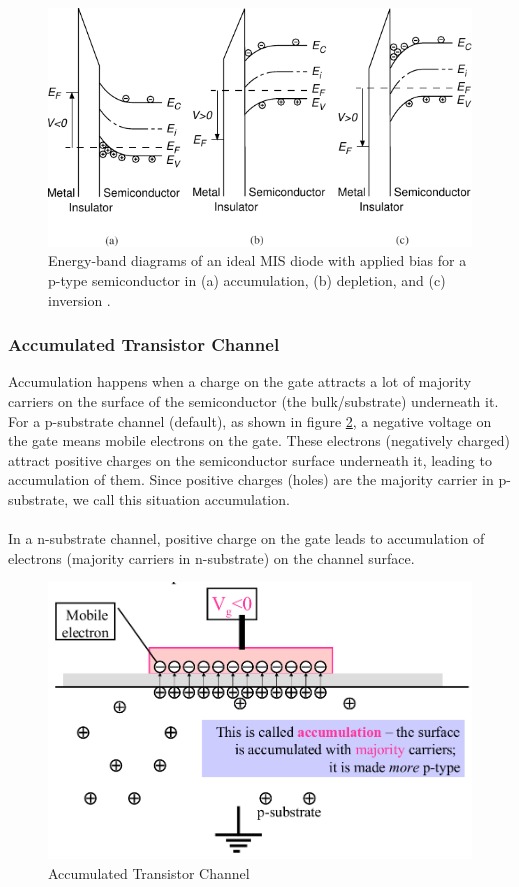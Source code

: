 \documentclass[main]{subfiles}
\begin{document}
\begin{figure}[H]
\centering
  \includegraphics[scale=1]{figs/operation_domains2.pdf}
  \caption{Energy-band diagrams of an ideal MIS diode with applied bias for a p-type semiconductor in (a) accumulation, (b) depletion, and (c) inversion \cite{book:VLSI}.}
    \label{fig:coperation_domains2}
\end{figure}

\subsubsection{Accumulated Transistor Channel}
Accumulation happens when a charge on the gate attracts a lot of majority carriers on the surface of the semiconductor (the bulk/substrate) underneath it.\\
For a p-substrate channel (default), as shown in figure \ref{fig:channel_accumulated}, a negative voltage on the gate means mobile electrons on the gate. These electrons (negatively charged) attract positive charges on the semiconductor surface underneath it, leading to accumulation of them. Since positive charges (holes) are the majority carrier in p-substrate, we call this situation accumulation.\\\\
In a n-substrate channel, positive charge on the gate leads to accumulation of electrons (majority carriers in n-substrate) on the channel surface.
\begin{figure}[H]
  \centering
  \includegraphics[scale=1]{figs/channel_accumulation.png}
  \caption{Accumulated Transistor Channel \cite{lec2}}
  \label{fig:channel_accumulated}
\end{figure}
\end{document}

